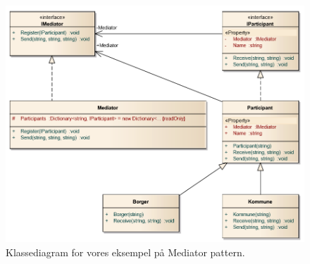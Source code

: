 \begin{figure}[h]
	\centering
	\includegraphics[width=\linewidth]{figs/classdiagram}
	\caption{Klassediagram for vores eksempel på Mediator pattern.}
	\label{fig:mediclass}
\end{figure}